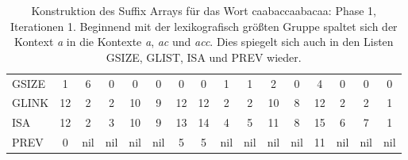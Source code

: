 \begin{table}[H]
\begin{adjustbox}{max width=\textwidth}
\begin{tabular}{lccccccccccccccc}
\multicolumn{1}{l|}{GSIZE}   & \multicolumn{1}{c|}{1}    & \cellcolor[HTML]{\red}6 & 0   & 0   & 0                         & 0                         & \multicolumn{1}{c|}{0}    & \multicolumn{1}{c|}{\cellcolor[HTML]{\red}1}  & \multicolumn{1}{c|}{\cellcolor[HTML]{\red}1}   & 2   & \multicolumn{1}{c|}{0}    & 4                          & 0                          & 0                          & 0                          \\
\multicolumn{1}{l|}{GLINK}   & 12                        & 2                         & 2   & 10  & \cellcolor[HTML]{\red}9 & 12                        & 12                        & 2                                               & 2                                                & 10  & \cellcolor[HTML]{\red}8 & 12                         & 2                          & 2                          & 1                          \\
\multicolumn{1}{l|}{ISA}     & 12                        & 2                         & 3   & 10  & \cellcolor[HTML]{\red}9 & 13                        & 14                        & \cellcolor[HTML]{\red}4                       & \cellcolor[HTML]{\red}5                        & 11  & \cellcolor[HTML]{\red}8 & 15                         & \cellcolor[HTML]{\red}6  & \cellcolor[HTML]{\red}7  & 1                          \\
\multicolumn{1}{l|}{PREV}    & \cellcolor[HTML]{\red}0 & nil                       & nil & nil & nil                       & \cellcolor[HTML]{\red}5 & \cellcolor[HTML]{\red}5 & nil                                             & nil                                              & nil & nil                       & \cellcolor[HTML]{\red}11 & nil                        & nil                        & nil                       
\end{tabular}
\end{adjustbox}

\caption[Konstruktion des Suffix Arrays f{\"u}r das Wort caabaccaabacaa: Phase 1, Iterationen 1]{Konstruktion des Suffix Arrays f{\"u}r das Wort caabaccaabacaa: Phase 1, Iterationen 1. Beginnend mit der lexikografisch gr{\"o}{\ss}ten Gruppe spaltet sich der Kontext \textit{a} in die Kontexte \textit{a}, \textit{ac} und \textit{acc}. Dies spiegelt sich auch in den Listen GSIZE, GLIST, ISA und PREV wieder.}
\label{table_complex_example_1_1} 
\end{table}

